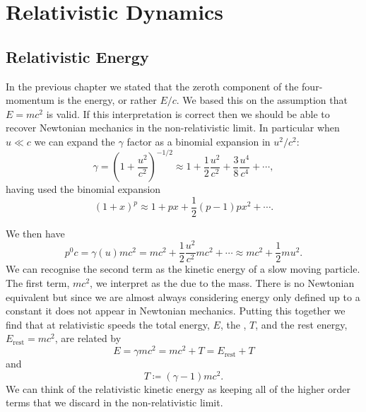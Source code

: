 \documentclass[fleqn]{NotesClass}
\begin{document}
    \chapter{Relativistic Dynamics}
    \section{Relativistic Energy}
    In the previous chapter we stated that the zeroth component of the four-momentum is the energy, or rather \(E/c\).
    We based this on the assumption that \(E = mc^2\) is valid.
    If this interpretation is correct then we should be able to recover Newtonian mechanics in the non-relativistic limit.
    In particular when \(u \ll c\) we can expand the \(\gamma\) factor as a binomial expansion in \(u^2/c^2\):
    \begin{equation}
        \gamma = \left( 1 + \frac{u^2}{c^2} \right)^{-1/2} \approx 1 + \frac{1}{2}\frac{u^2}{c^2} + \frac{3}{8}\frac{u^4}{c^4} + \dotsb,
    \end{equation}
    having used the binomial expansion
    \begin{equation}
        (1 + x)^p \approx 1 + px + \frac{1}{2}(p - 1)px^2 + \dotsb.
    \end{equation}

    We then have
    \begin{equation}
        p^0c = \gamma(u) mc^2 = mc^2 + \frac{1}{2}\frac{u^2}{c^2}mc^2 + \dotsb \approx mc^2 + \frac{1}{2}mu^2.
    \end{equation}
    We can recognise the second term as the kinetic energy of a slow moving particle.
    The first term, \(mc^2\), we interpret as the  due to the mass.
    There is no Newtonian equivalent but since we are almost always considering energy only defined up to a constant it does not appear in Newtonian mechanics.
    Putting this together we find that at relativistic speeds the total energy, \(E\), the , \(T\), and the rest energy, \(E_{\mathrm{rest}} = mc^2\), are related by
    \begin{equation}
        E = \gamma mc^2 = mc^2 + T = E_{\mathrm{rest}} + T
    \end{equation}
    and
    \begin{equation}
        T \coloneqq (\gamma - 1)mc^2.
    \end{equation}
    We can think of the relativistic kinetic energy as keeping all of the higher order terms that we discard in the non-relativistic limit.
    
\end{document}
